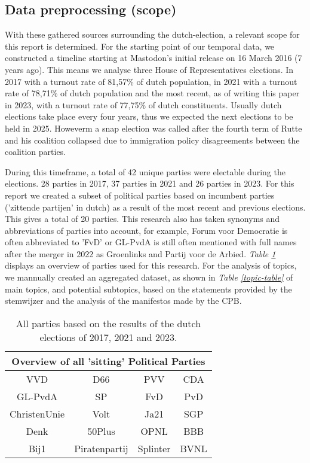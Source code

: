 \subsection{Data preprocessing (scope)}
With these gathered sources surrounding the dutch-election, a relevant scope for this report is determined.
For the starting point of our temporal data, we constructed a timeline starting at Mastodon's initial release on 16 March 2016 (7 years ago).
This means we analyse three House of Representatives elections.
In 2017 with a turnout rate of 81,57\% of dutch population, in 2021 with a turnout rate of 78,71\% of dutch population and the most recent, as of writing this paper in 2023, with a turnout rate of 77,75\% of dutch constituents.
Usually dutch elections take place every four years, thus we expected the next elections to be held in 2025.
Howeverm a snap election was called after the fourth term of Rutte and his coalition collapsed due to immigration policy disagreements between the coalition parties.

During this timeframe, a total of 42 unique parties were electable during the elections.
28 parties in 2017, 37 parties in 2021 and 26 parties in 2023.
For this report we created a subset of political parties based on incumbent parties ('zittende partijen' in dutch) as a result of the most recent and previous elections.
This gives a total of 20 parties.
This research also has taken synonyms and abbreviations of parties into account, for example, Forum voor Democratie is often abbreviated to 'FvD' or GL-PvdA is still often mentioned with full names after the merger in 2022 as Groenlinks and Partij voor de Arbied.
\textit{Table \ref{party-table}} displays an overview of parties used for this research.
For the analysis of topics, we mannually created an aggregated dataset, as shown in \textit{Table \ref{topic-table}} of main topics, and potential subtopics, based on the statements provided by the stemwijzer and the analysis of the manifestos made by the CPB.  \\

\begin{table}
\begin{center}
\begin{tabular}{||c c c c||} 
 \hline
 \multicolumn{4}{|c|}{\textbf{Overview of all 'sitting' Political Parties}} \\
 \hline
 VVD & D66 & PVV & CDA \\
 \hline
 GL-PvdA & SP & FvD & PvD \\
 \hline
 ChristenUnie & Volt & Ja21 & SGP \\
 \hline
 Denk & 50Plus & OPNL & BBB \\
 \hline
 Bij1 & Piratenpartij &  Splinter & BVNL  \\ [1ex] 
 \hline
 
\end{tabular}
\\
\caption{\label{party-table}All parties based on the results of the dutch elections of 2017, 2021 and 2023.}
\end{center}
\end{table}

